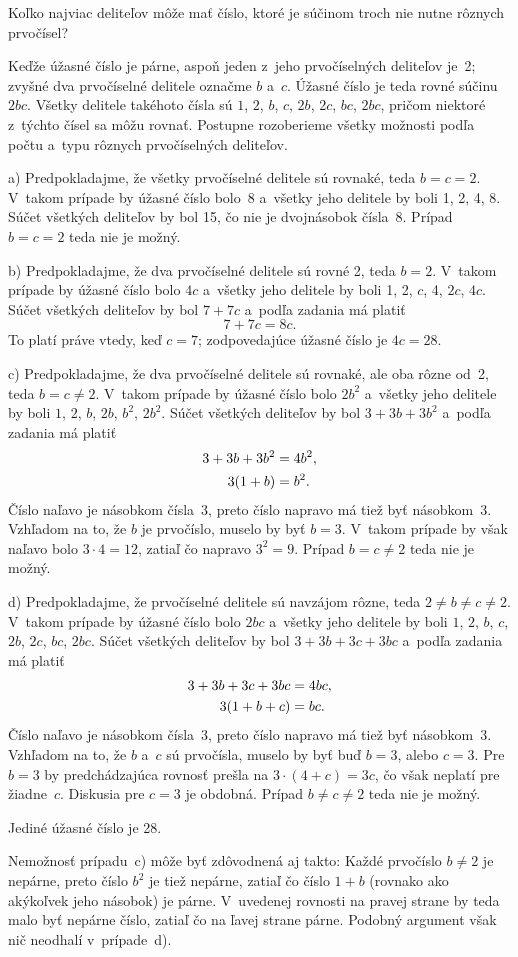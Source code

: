 {%
\napad
Koľko najviac deliteľov môže mať číslo, ktoré je súčinom troch nie nutne rôznych
prvočísel?

\riesenie
Keďže úžasné číslo je párne, aspoň jeden z~jeho prvočíselných deliteľov je~2;
zvyšné dva prvočíselné delitele označme $b$ a~$c$.
Úžasné číslo je teda rovné súčinu~$2bc$.
Všetky delitele takéhoto čísla sú $1$, $2$, $b$, $c$, $2b$, $2c$, $bc$, $2bc$,
pričom niektoré z~týchto čísel sa môžu rovnať.
Postupne rozoberieme všetky možnosti podľa počtu a~typu rôznych prvočíselných
deliteľov.

\smallskip a)
Predpokladajme, že všetky prvočíselné delitele sú rovnaké, teda $b=c=2$.
V~takom prípade by úžasné číslo bolo~8 a~všetky jeho delitele by boli
1, 2, 4, 8.
Súčet všetkých deliteľov by bol 15, čo nie je dvojnásobok čísla~8.
Prípad $b=c=2$ teda nie je možný.

\smallskip b)
Predpokladajme, že dva prvočíselné delitele sú rovné 2, teda $b=2$.
V~takom prípade by úžasné číslo bolo $4c$ a~všetky jeho delitele by boli
1, 2, $c$, 4, $2c$, $4c$.
Súčet všetkých deliteľov by bol $7+7c$ a~podľa zadania má platiť
$$
7+7c=8c.
$$
To platí práve vtedy, keď $c=7$; zodpovedajúce úžasné číslo je $4c=28$.

\smallskip c)
Predpokladajme, že dva prvočíselné delitele sú rovnaké, ale oba rôzne od~2,
teda $b=c\ne 2$.
V~takom prípade by úžasné číslo bolo $2b^2$ a~všetky jeho delitele by boli
$1$, $2$, $b$, $2b$, $b^2$, $2b^2$.
Súčet všetkých deliteľov by bol $3+3b+3b^2$ a~podľa zadania má platiť
$$
\aligned
3+3b+3b^2 &=4b^2, \\
3(1+b) &=b^2.
\endaligned
$$
Číslo naľavo je násobkom čísla~3, preto číslo napravo má tiež byť násobkom~3.
Vzhľadom na to, že $b$ je prvočíslo, muselo by byť $b=3$.
V~takom prípade by však naľavo bolo $3\cdot 4=12$, zatiaľ čo napravo $3^2=9$.
Prípad $b=c\ne 2$ teda nie je možný.

\smallskip d)
Predpokladajme, že prvočíselné delitele sú navzájom rôzne, teda
$2\ne b\ne c\ne 2$.
V~takom prípade by úžasné číslo bolo $2bc$ a~všetky jeho delitele by boli
$1$, $2$, $b$, $c$, $2b$, $2c$, $bc$, $2bc$.
Súčet všetkých deliteľov by bol $3+3b+3c+3bc$ a~podľa zadania má platiť
$$
\aligned
3+3b+3c+3bc &=4bc, \\
3(1+b+c) &= bc.
\endaligned
$$
Číslo naľavo je násobkom čísla~3, preto číslo napravo má tiež byť násobkom~3.
Vzhľadom na to, že $b$ a~$c$ sú prvočísla, muselo by byť buď $b=3$,
alebo $c=3$.
Pre $b=3$ by predchádzajúca rovnosť prešla na $3\cdot(4+c)=3c$, čo však
neplatí pre žiadne~$c$.
Diskusia pre $c=3$ je obdobná.
Prípad $b\ne c\ne 2$ teda nie je možný.

\smallskip
Jediné úžasné číslo je 28.

\poznamka
Nemožnosť prípadu~c) môže byť zdôvodnená aj takto:
Každé prvočíslo $b\ne2$ je nepárne, preto číslo $b^2$ je tiež nepárne, zatiaľ čo
číslo $1+b$ (rovnako ako akýkoľvek jeho násobok) je párne.
V~uvedenej rovnosti na pravej strane by teda malo byť nepárne číslo, zatiaľ čo
na ľavej strane párne.
Podobný argument však nič neodhalí v~prípade~d).
}

